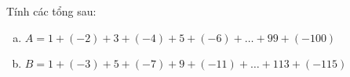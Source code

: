\begin{bt}
\end{bt}   \begin{bt}
Tính các tổng sau:
\begin{enumerate}[a)]
\item $A= 1 + (-2) + 3 +(-4)+ 5+ (-6) + \ldots + 99+(-100)$
\item $B = 1+ (-3) + 5 + (-7)+ 9+ (-11) + \ldots + 113+ (-115)$
\end{enumerate}
\end{bt}